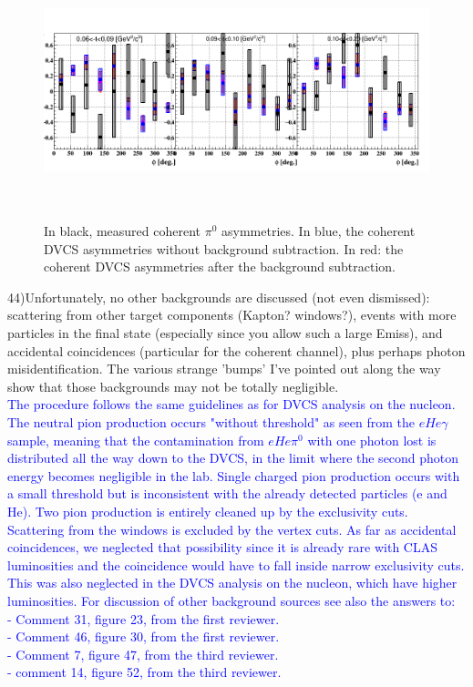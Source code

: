 \begin{figure}[tbp]
   \centering
   \includegraphics[height=7.5cm]{fig/coherent_AlU_pi0.png}
   \caption{In black, measured coherent $\pi^{0}$ asymmetries. In blue, the 
   coherent DVCS asymmetries without background subtraction. In red: the 
coherent DVCS asymmetries after the background subtraction.}
   \label{fig:coh_dvcs_pi0_Alu}
    \end{figure}


 
44)Unfortunately, no other backgrounds are discussed (not even dismissed): 
scattering from other target components (Kapton? windows?), events with more 
particles in the final state (especially since you allow such a large Emiss), 
and accidental coincidences (particular for the coherent channel), plus perhaps 
photon misidentification. The various strange 'bumps' I've pointed out along 
the way show that those backgrounds may not be totally negligible. \\
\textcolor{blue}{The procedure follows the same guidelines as for DVCS 
analysis on the nucleon. The neutral pion production occurs "without threshold" 
as seen from the $eHe\gamma$ sample, meaning that the contamination from 
$eHe\pi^0$ with one photon lost is distributed all the way down to the DVCS, 
in the limit where the second photon energy becomes negligible in 
the lab. Single charged pion production occurs with a small threshold but is 
inconsistent with the already detected particles (e and He). Two pion 
production is entirely cleaned up by the exclusivity cuts. Scattering from the 
windows is excluded by the vertex cuts. As far as accidental coincidences, we 
neglected that possibility since it is already rare with CLAS luminosities and 
the coincidence would have to fall inside narrow exclusivity cuts. This was 
also neglected in the DVCS analysis on the nucleon, which have higher 
luminosities. For discussion of other background sources see also the answers to:\\
- Comment 31, figure 23, from the first reviewer.\\
- Comment 46, figure 30, from the first reviewer.\\
- Comment 7, figure 47, from the third reviewer.\\
- comment 14, figure 52, from the third reviewer.}\\


